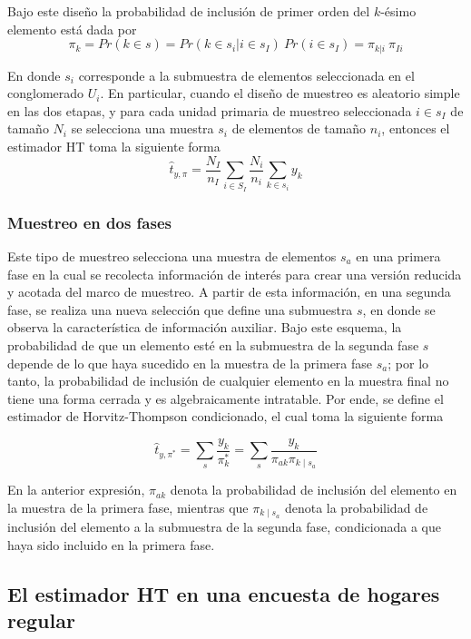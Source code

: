 \documentclass[
  12pt,
  spanish,
]{book}
\begin{document}
Bajo este diseño la probabilidad de inclusión de primer orden del \(k\)-ésimo elemento está dada por
\[
\pi_{k}=Pr(k\in s)=Pr(k\in s_i|i\in s_I)\ Pr(i\in s_I)=\pi_{k|i}\ \pi_{Ii}
\]

En donde \(s_i\) corresponde a la submuestra de elementos seleccionada en el conglomerado \(U_i\). En particular, cuando el diseño de muestreo es aleatorio simple en las dos etapas, y para cada unidad primaria de muestreo seleccionada \(i\in s_{I}\) de tamaño \(N_i\) se selecciona una muestra \(s_i\) de elementos de tamaño \(n_i\), entonces el estimador HT toma la siguiente forma
\[
\hat{t}_{y,\pi}=\frac{N_{I}}{n_{I}}\sum_{i\in S_{I}}\frac{N_i}{n_i}\sum_{k\in s_i}y_k
\]

\hypertarget{muestreo-en-dos-fases-1}{%
\subsubsection{Muestreo en dos fases}\label{muestreo-en-dos-fases-1}}

Este tipo de muestreo selecciona una muestra de elementos \(s_a\) en una primera fase en la cual se recolecta información de interés para crear una versión reducida y acotada del marco de muestreo. A partir de esta información, en una segunda fase, se realiza una nueva selección que define una submuestra \(s\), en donde se observa la característica de información auxiliar. Bajo este esquema, la probabilidad de que un elemento esté en la submuestra de la segunda fase \(s\) depende de lo que haya sucedido en la muestra de la primera fase \(s_a\); por lo tanto, la probabilidad de inclusión de cualquier elemento en la muestra final no tiene una forma cerrada y es algebraicamente intratable. Por ende, se define el estimador de Horvitz-Thompson condicionado, el cual toma la siguiente forma

\[
\hat{t}_{y,\pi^*}=\sum_{s}\frac{y_k}{\pi_{k}^*}=\sum_{s}\frac{y_k}{\pi_{ak}\pi_{k\mid{s_a}}}
\]

En la anterior expresión, \(\pi_{ak}\) denota la probabilidad de inclusión del elemento en la muestra de la primera fase, mientras que \(\pi_{k\mid{s_a}}\) denota la probabilidad de inclusión del elemento a la submuestra de la segunda fase, condicionada a que haya sido incluido en la primera fase.

\hypertarget{el-estimador-ht-en-una-encuesta-de-hogares-regular}{%
\subsection{El estimador HT en una encuesta de hogares regular}\label{el-estimador-ht-en-una-encuesta-de-hogares-regular}}
\end{document}
